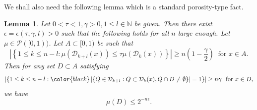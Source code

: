\documentclass[a4paper,11pt]{amsart}
\newtheorem{lemma}[theorem]{Lemma}
\theoremstyle{definition}
\numberwithin{equation}{section}
\def\D{\mathcal{D}}
\def\cP{\mathcal P}
\def\N{\mathbb N}
\begin{document}
We shall also need the following lemma which is a standard porosity-type fact. 
\begin{lemma}\label{lemma:porous-set-small-mass}
Let $0<\tau<1,\gamma>0, 1\le l\in \N$ be given. Then there exist $\epsilon=\epsilon(\tau,\gamma,l)>0$  such that the following holds for all $n$  large enough.  Let $\mu\in \cP([0,1))$.  Let $A\subset [0,1)$ be such that
\begin{equation}\label{eq:lemma:porous-set-small-mass:1}
\left| \left\{1\le k\le n-l: \mu(\D_{k+l}(x)) \le \tau \mu(\D_{k}(x))\right\} \right| \ge n(1-\frac{\gamma}{2}) \ \textrm{ for } x\in A.
\end{equation}
Then for any set $D\subset A$ satisfying
 \begin{equation}\label{eq:lemma:porous-set-small-mass:2}
\left| \left\{1\le k\le n-l: {\color{black}\left| \left\{Q\in \D_{k+l}:Q\subset \D_k(x),  Q\cap D\neq\emptyset  \right\} \right|=1} \right\} \right| \ge n\gamma \ \textrm{ for } x\in D,
\end{equation}
we have
\[\mu(D)\le 2^{-n\epsilon}.\]
\end{lemma}
\end{document}
